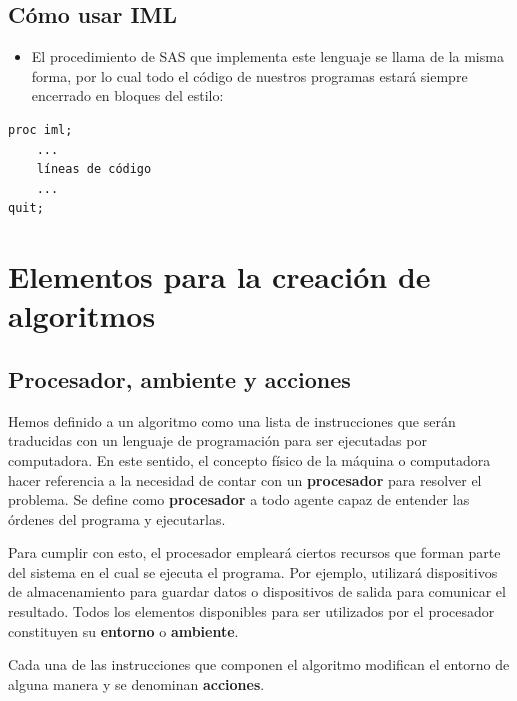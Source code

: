 \documentclass[]{book}
\providecommand{\tightlist}{%
  \setlength{\itemsep}{0pt}\setlength{\parskip}{0pt}}
\begin{document}
\hypertarget{como-usar-iml}{%
\section{Cómo usar IML}\label{como-usar-iml}}

\begin{itemize}
\tightlist
\item
  El procedimiento de SAS que implementa este lenguaje se llama de la misma forma, por lo cual todo el código de nuestros programas estará siempre encerrado en bloques del estilo:
\end{itemize}

\begin{verbatim}
proc iml;
    ...
    líneas de código
    ...
quit;
\end{verbatim}

\hypertarget{elementos-para-la-creacion-de-algoritmos}{%
\chapter{Elementos para la creación de algoritmos}\label{elementos-para-la-creacion-de-algoritmos}}

\hypertarget{procesador-ambiente-y-acciones}{%
\section{Procesador, ambiente y acciones}\label{procesador-ambiente-y-acciones}}

Hemos definido a un algoritmo como una lista de instrucciones que serán traducidas con un lenguaje de programación para ser ejecutadas por computadora. En este sentido, el concepto físico de la máquina o computadora hacer referencia a la necesidad de contar con un \textbf{procesador} para resolver el problema. Se define como \textbf{procesador} a todo agente capaz de entender las órdenes del programa y ejecutarlas.

Para cumplir con esto, el procesador empleará ciertos recursos que forman parte del sistema en el cual se ejecuta el programa. Por ejemplo, utilizará dispositivos de almacenamiento para guardar datos o dispositivos de salida para comunicar el resultado. Todos los elementos disponibles para ser utilizados por el procesador constituyen su \textbf{entorno} o \textbf{ambiente}.

Cada una de las instrucciones que componen el algoritmo modifican el entorno de alguna manera y se denominan \textbf{acciones}.
\end{document}
